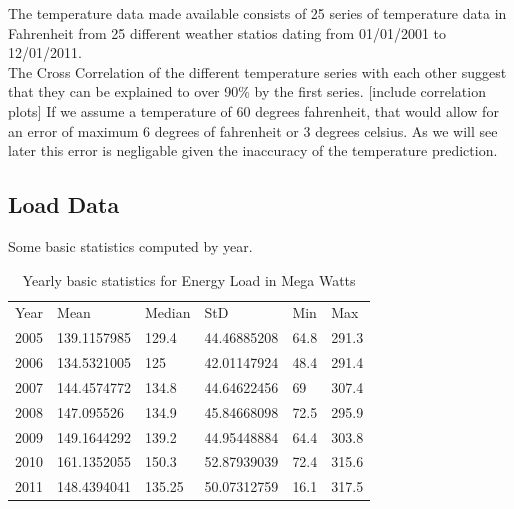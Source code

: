 \documentclass{article}
\begin{document}
The temperature data made available consists of 25 series of temperature data in Fahrenheit from 25 different weather statios dating from 01/01/2001 to 12/01/2011.\\
The Cross Correlation of the different temperature series with each other suggest that they can be explained to over 90\% by the first series. [include correlation plots]
If we assume a temperature of 60 degrees fahrenheit, that would allow for an error of maximum 6 degrees of fahrenheit or 3 degrees celsius. As we will see later this error is negligable given the inaccuracy of the temperature prediction.

\subsection{Load Data}
Some basic statistics computed by year.
\begin{table}[!h]
\centering
\begin{tabular}{llllll}
Year & Mean        & Median & StD         & Min  & Max   \\
2005 & 139.1157985 & 129.4  & 44.46885208 & 64.8 & 291.3 \\
2006 & 134.5321005 & 125    & 42.01147924 & 48.4 & 291.4 \\
2007 & 144.4574772 & 134.8  & 44.64622456 & 69   & 307.4 \\
2008 & 147.095526  & 134.9  & 45.84668098 & 72.5 & 295.9 \\
2009 & 149.1644292 & 139.2  & 44.95448884 & 64.4 & 303.8 \\
2010 & 161.1352055 & 150.3  & 52.87939039 & 72.4 & 315.6 \\
2011 & 148.4394041 & 135.25 & 50.07312759 & 16.1 & 317.5
\end{tabular}
\caption{Yearly basic statistics for Energy Load in Mega Watts}
\end{table}
\end{document}
